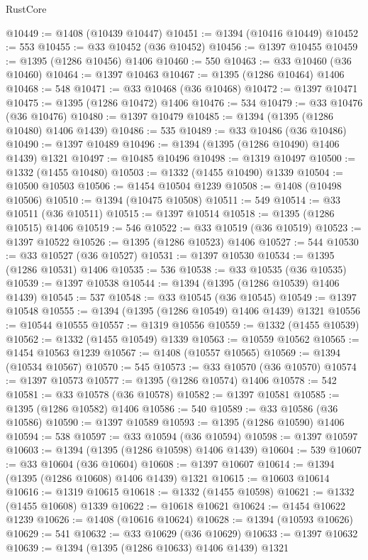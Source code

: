 \begin{lexlean}{RustCore}
\begin{coremodule}
@10449 := @1408 (@10439 @10447)
@10451 := @1394 (@10416 @10449)
@10452 := 553
@10455 := @33 @10452 (@36 @10452)
@10456 := @1397 @10455
@10459 := @1395 (@1286 @10456) @1406
@10460 := 550
@10463 := @33 @10460 (@36 @10460)
@10464 := @1397 @10463
@10467 := @1395 (@1286 @10464) @1406
@10468 := 548
@10471 := @33 @10468 (@36 @10468)
@10472 := @1397 @10471
@10475 := @1395 (@1286 @10472) @1406
@10476 := 534
@10479 := @33 @10476 (@36 @10476)
@10480 := @1397 @10479
@10485 := @1394 (@1395 (@1286 @10480) @1406 @1439)
@10486 := 535
@10489 := @33 @10486 (@36 @10486)
@10490 := @1397 @10489
@10496 := @1394 (@1395 (@1286 @10490) @1406 @1439) @1321
@10497 := @10485 @10496
@10498 := @1319 @10497
@10500 := @1332 (@1455 @10480)
@10503 := @1332 (@1455 @10490) @1339
@10504 := @10500 @10503
@10506 := @1454 @10504 @1239
@10508 := @1408 (@10498 @10506)
@10510 := @1394 (@10475 @10508)
@10511 := 549
@10514 := @33 @10511 (@36 @10511)
@10515 := @1397 @10514
@10518 := @1395 (@1286 @10515) @1406
@10519 := 546
@10522 := @33 @10519 (@36 @10519)
@10523 := @1397 @10522
@10526 := @1395 (@1286 @10523) @1406
@10527 := 544
@10530 := @33 @10527 (@36 @10527)
@10531 := @1397 @10530
@10534 := @1395 (@1286 @10531) @1406
@10535 := 536
@10538 := @33 @10535 (@36 @10535)
@10539 := @1397 @10538
@10544 := @1394 (@1395 (@1286 @10539) @1406 @1439)
@10545 := 537
@10548 := @33 @10545 (@36 @10545)
@10549 := @1397 @10548
@10555 := @1394 (@1395 (@1286 @10549) @1406 @1439) @1321
@10556 := @10544 @10555
@10557 := @1319 @10556
@10559 := @1332 (@1455 @10539)
@10562 := @1332 (@1455 @10549) @1339
@10563 := @10559 @10562
@10565 := @1454 @10563 @1239
@10567 := @1408 (@10557 @10565)
@10569 := @1394 (@10534 @10567)
@10570 := 545
@10573 := @33 @10570 (@36 @10570)
@10574 := @1397 @10573
@10577 := @1395 (@1286 @10574) @1406
@10578 := 542
@10581 := @33 @10578 (@36 @10578)
@10582 := @1397 @10581
@10585 := @1395 (@1286 @10582) @1406
@10586 := 540
@10589 := @33 @10586 (@36 @10586)
@10590 := @1397 @10589
@10593 := @1395 (@1286 @10590) @1406
@10594 := 538
@10597 := @33 @10594 (@36 @10594)
@10598 := @1397 @10597
@10603 := @1394 (@1395 (@1286 @10598) @1406 @1439)
@10604 := 539
@10607 := @33 @10604 (@36 @10604)
@10608 := @1397 @10607
@10614 := @1394 (@1395 (@1286 @10608) @1406 @1439) @1321
@10615 := @10603 @10614
@10616 := @1319 @10615
@10618 := @1332 (@1455 @10598)
@10621 := @1332 (@1455 @10608) @1339
@10622 := @10618 @10621
@10624 := @1454 @10622 @1239
@10626 := @1408 (@10616 @10624)
@10628 := @1394 (@10593 @10626)
@10629 := 541
@10632 := @33 @10629 (@36 @10629)
@10633 := @1397 @10632
@10639 := @1394 (@1395 (@1286 @10633) @1406 @1439) @1321

\end{coremodule}
\end{lexlean}
